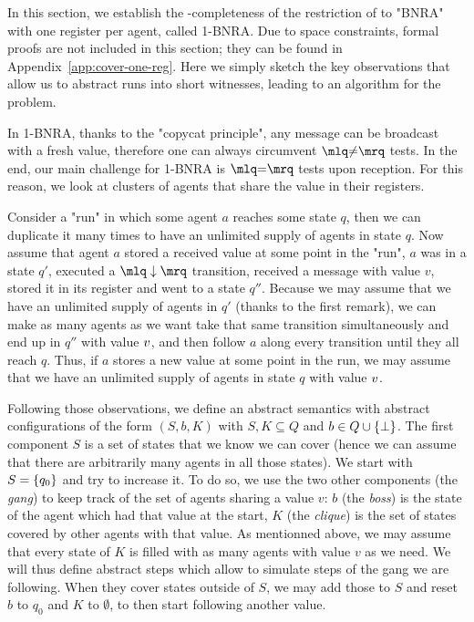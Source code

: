 In this section, we establish the \NP-completeness of the restriction of \COVER to "BNRA" with one register per agent, called 1-BNRA. Due to space constraints, formal proofs are not included in this section; they can be found in Appendix~\ref{app:cover-one-reg}. Here we simply sketch the key observations that allow us to abstract runs into short witnesses, leading to an \NP algorithm for the problem.
	
	In 1-BNRA, thanks to the "copycat principle", any  message can be broadcast with a fresh value, therefore one can always circumvent $\quotemarks{\diseqtestact}$ tests. In the end, our main challenge for 1-BNRA is $\quotemarks{\eqtestact}$ tests upon reception.
	For this reason, we look at clusters of agents that share the value in their registers. 

	Consider a "run" in which some agent $a$ reaches some state $q$, then we can duplicate it many times to have an unlimited supply of agents in state $q$.
	Now assume that agent $a$ stored a received value at some point in the "run", $a$ was in a state $q'$, executed a $\quotemarks{\enregact}$ transition, received a message with value $v$, stored it in its register and went to a state $q''$. 
	Because we may assume that we have an unlimited supply of agents in $q'$ (thanks to the first remark), we can make as many agents as we want take that same transition simultaneously and end up in $q''$ with value $v$, and then follow $a$ along every transition until they all reach $q$. 
	Thus, if $a$ stores a new value at some point in the run, we may assume that we have an unlimited supply of agents in state $q$ with value $v$. 
	
	Following those observations, we define an abstract semantics with abstract configurations of the form $(S, b, K)$ with $S, K \subseteq Q$ and $b \in Q \cup \{\bot\}$. The first component $S$ is a set of states that we know we can cover (hence we can assume that there are arbitrarily many agents in all those states).
	We start with $S = \{q_0\}$ and try to increase it. To do so, we use the two other components (the \emph{gang}) to keep track of the set of agents sharing a value $v$: $b$ (the \emph{boss}) is the state of the agent which had that value at the start, $K$ (the \emph{clique}) is the set of states covered by other agents with that value. As mentionned above, we may assume that every state of $K$ is filled with as many agents with value $v$ as we need. 
	We will thus define abstract steps which allow to simulate steps of the gang we are following. When they cover states outside of $S$, we may add those to $S$ and reset $b$ to $q_0$ and $K$  to $\emptyset$, to then start following another value.
	
